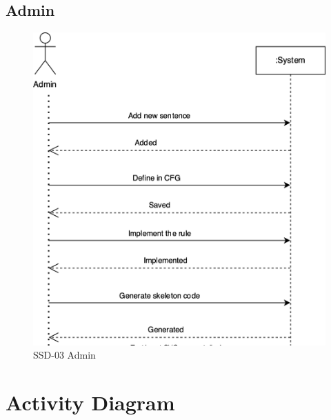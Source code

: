 \documentclass[12pt,a4paper]{article}
\begin{document}
\subsection{Admin}
\begin{figure}[h]
 \centering
\includegraphics[scale=0.30]{Diagram/Admin_SSD.png}
\caption{SSD-03 Admin}
\end{figure}
\newpage
\section{Activity Diagram}
\end{document}

